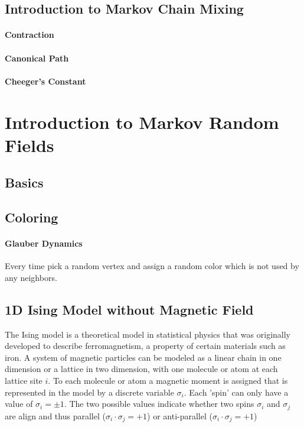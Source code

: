 \documentclass{article}
\theoremstyle{definition}
\newcommand{\<}{\left\langle}
\renewcommand{\>}{\right\rangle}
\begin{document}
\subsection{Introduction to Markov Chain Mixing}

\paragraph{Contraction}

\paragraph{Canonical Path}

\paragraph{Cheeger's Constant}


\section{Introduction to Markov Random Fields}
\subsection{Basics}


\subsection{Coloring}

\paragraph{Glauber Dynamics}
Every time pick a random vertex and assign a random color which is not used by any neighbors.


\subsection{1D Ising Model without Magnetic Field}
The Ising model is a theoretical model in statistical physics that was originally developed
to describe ferromagnetism, a property of certain materials such as iron. A system of magnetic particles can be modeled as a linear
chain in one dimension or a lattice in two dimension, with one molecule or atom at each
lattice site $i$. To each molecule or atom a magnetic moment is assigned that is represented
in the model by a discrete variable $\sigma_i$. Each 'spin' can only have a value of $\sigma_i = \pm 1$.
The two possible values indicate whether two spins $\sigma_i$ and $\sigma_j$ are align and thus parallel
($\sigma_i \cdot \sigma_j = +1$) or anti-parallel ($\sigma_i \cdot \sigma_j = +1$)
\end{document}
